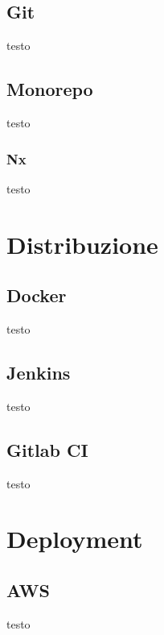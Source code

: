 \subsection{Git}
testo

\subsection{Monorepo}
testo
\subsubsection{Nx}
testo

\section{Distribuzione}
\subsection{Docker}
testo
\subsection{Jenkins}
testo
\subsection{Gitlab CI}
testo

\section{Deployment}
\subsection{AWS}
testo
